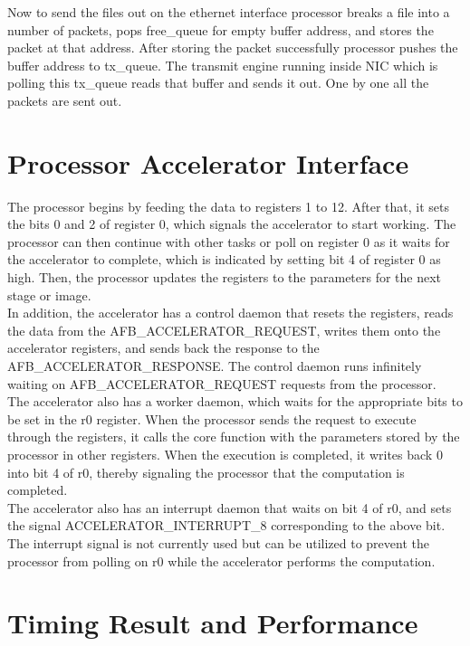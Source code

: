 \documentclass[12pt]{report}
\begin{document}
Now to send the files out on the ethernet interface processor breaks a file into a number of packets, pops free\_queue for empty buffer address, and stores the packet at that address. After storing the packet successfully processor pushes the buffer address to tx\_queue. The transmit engine running inside NIC which is polling this tx\_queue reads that buffer and sends it out. One by one all the packets are sent out.



\section{Processor Accelerator Interface}

The processor begins by feeding the data to registers 1 to 12. After that, it sets the bits 0 and 2 of register 0, which signals the accelerator to start working. The processor can then continue with other tasks or poll on register 0 as it waits for the accelerator to complete, which is indicated by setting bit 4 of register 0 as high. Then, the processor updates the registers to the parameters for the next stage or image.
\\

In addition, the accelerator has a control daemon that resets the registers, reads the data from the AFB\_ACCELERATOR\_REQUEST, writes them onto the accelerator registers, and sends back the response to the AFB\_ACCELERATOR\_RESPONSE. The control daemon runs infinitely waiting on AFB\_ACCELERATOR\_REQUEST requests from the processor.
\\

The accelerator also has a worker daemon, which waits for the appropriate bits to be set in the r0 register. When the processor sends the request to execute through the registers, it calls the core function with the parameters stored by the processor in other registers. When the execution is completed, it writes back 0 into bit 4 of r0, thereby signaling the processor that the computation is completed.
\\

The accelerator also has an interrupt daemon that waits on bit 4 of r0, and sets the signal ACCELERATOR\_INTERRUPT\_8 corresponding to the above bit. The interrupt signal is not currently used but can be utilized to prevent the processor from polling on r0 while the accelerator performs the computation.
\\

\section{Timing Result and Performance}
\newpage
\end{document}
